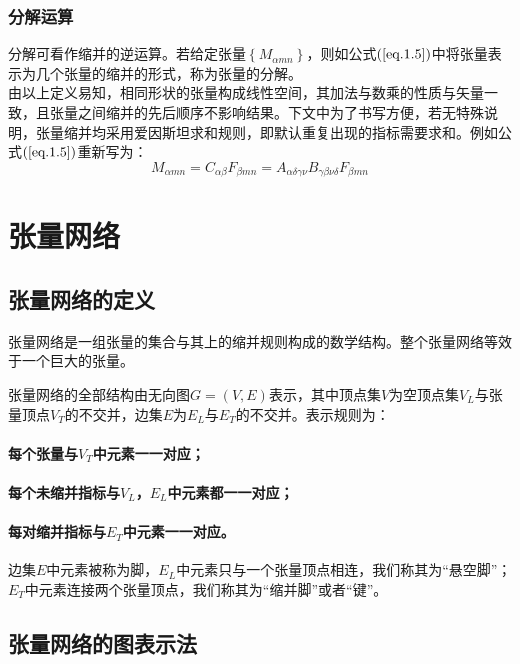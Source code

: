 \subsubsection{分解运算}

分解可看作缩并的逆运算。若给定张量$\left\{M_{\alpha m n}\right\}$，则如公式$(\ref{eq.1.5})$中将张量表示为几个张量的缩并的形式，称为张量的分解。\\

由以上定义易知，相同形状的张量构成线性空间，其加法与数乘的性质与矢量一致，且张量之间缩并的先后顺序不影响结果。下文中为了书写方便，若无特殊说明，张量缩并均采用爱因斯坦求和规则，即默认重复出现的指标需要求和。例如公式$(\ref{eq.1.5})$重新写为：
\[
M_{\alpha m n} = C_{\alpha\beta} F_{\beta m n}
	= A_{\alpha\delta\gamma\nu} B_{\gamma\beta\nu\delta} F_{\beta m n}
\]


\section{张量网络}

\subsection{张量网络的定义}

张量网络是一组张量的集合与其上的缩并规则构成的数学结构。整个张量网络等效于一个巨大的张量\cite{hsiaoJournalClubBrief}。

张量网络的全部结构由无向图$G=(V,E)$表示，其中顶点集$V$为空顶点集$V_L$与张量顶点$V_T$的不交并，边集$E$为$E_L$与$E_T$的不交并。表示规则为：
\paragraph{每个张量与$V_T$中元素一一对应；}

\paragraph{每个未缩并指标与$V_L$，$E_L$中元素都一一对应；}

\paragraph{每对缩并指标与$E_T$中元素一一对应。}

边集$E$中元素被称为脚，$E_L$中元素只与一个张量顶点相连，我们称其为“悬空脚”；$E_T$中元素连接两个张量顶点，我们称其为“缩并脚”或者“键”。

\subsection{张量网络的图表示法}


